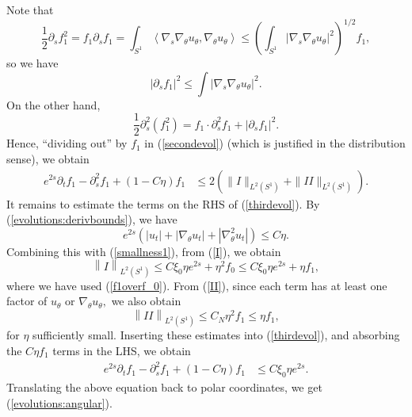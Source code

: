 \documentclass[12pt]{amsart}
\theoremstyle{others}
\numberwithin{equation}{section}
\def\<{\left\langle} \def\>{\right\rangle}
\def\({\left(} \def\){\right)}
\renewcommand{\th}{\theta}
\newcommand{\p}{\partial}
\newcommand{\n}{\nabla}
\begin{document}
Note that
\[ \frac12\p_s f_1^2= f_1\p_s f_1=\int_{S^1}\<\n_s \n_\th u_{\th}, \n_\th u_\th\>\le \(\int_{S^1}|\n_s \n_\th u_{\th}|^2\)^{1/2}f_1,\]
so we have
$$|\p_s f_1|^2\le\int |\n_s \n_\th u_{\th}|^2.$$
On the other hand,
\[ \frac12\p_s^2(f_1^2)=f_1\cdot \p_s^2 f_1+ |\p_s f_1|^2.\]
Hence, ``dividing out'' by $f_1$ in (\ref{secondevol}) (which is justified in the distribution sense), we obtain
\begin{equation}\label{thirdevol}
\begin{split}
e^{2s} \partial_t f_1 - \p_s^2f_1 + (1 - C\eta) f_1 & \leq 2 \left( \|I\|_{L^2(S^1)} + \|II\|_{L^2(S^1)} \right).
\end{split}
\end{equation}
It remains to estimate the terms on the RHS of (\ref{thirdevol}). By (\ref{evolutions:derivbounds}), we have
\begin{equation*}%
e^{2s} \left(|u_t| + |\nabla_\theta u_t| + |\nabla^2_\theta u_t| \right) \leq C \eta.
\end{equation*}
Combining this with (\ref{smallness1}), from (\ref{I}), we obtain
\begin{equation*}
\left\| I \right\|_{L^2(S^1) } \leq C \xi_0 \eta e^{2s} + \eta^2 f_0 \leq C \xi_0 \eta e^{2s} + \eta f_1,
\end{equation*}
where we have used (\ref{f1overf_0}).
From (\ref{II}), since each term has at least one factor of $u_\theta$ or $\n_\theta u_\th,$ we also obtain
\begin{equation*}
\left\| I\! I \right\|_{L^2(S^1) } \leq C_N \eta^2 f_1 \leq \eta f_1,
\end{equation*}
for $\eta$ sufficiently small.
Inserting these estimates into (\ref{thirdevol}), and absorbing the $C \eta f_1$ terms in the LHS, we obtain
\begin{equation}\label{fourthevol}
\begin{split}
e^{2s} \partial_t f_1 - \p_s^2f_1 + (1 - C\eta) f_1 & \leq C \xi_0 \eta e^{2s}.
\end{split}
\end{equation}
Translating the above equation back to polar coordinates, we get (\ref{evolutions:angular}).
\end{document}
